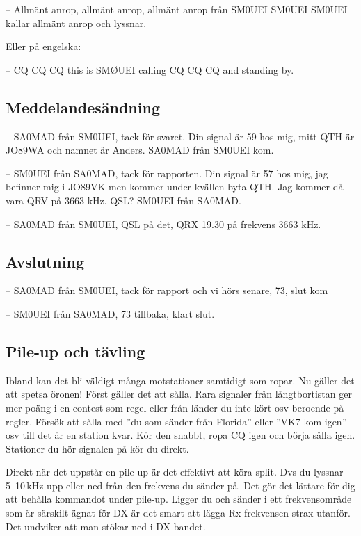 -- Allmänt anrop, allmänt anrop, allmänt anrop från SM0UEI SM0UEI SM0UEI kallar
allmänt anrop och lyssnar.

Eller på engelska:

-- CQ CQ CQ this is SMØUEI calling CQ CQ CQ and standing by.

\subsection{Meddelandesändning}

-- SA0MAD från SM0UEI, tack för svaret. Din signal är 59 hos mig, mitt QTH är
JO89WA och namnet är Anders. SA0MAD från SM0UEI kom.

-- SM0UEI från SA0MAD, tack för rapporten. Din signal är 57 hos mig, jag
befinner mig i JO89VK men kommer under kvällen byta QTH. Jag kommer då vara QRV
på 3663 kHz. QSL? SM0UEI från SA0MAD.

-- SA0MAD från SM0UEI, QSL på det, QRX 19.30 på frekvens 3663 kHz.

\subsection{Avslutning}

-- SA0MAD från SM0UEI, tack för rapport och vi hörs senare, 73, slut kom

-- SM0UEI från SA0MAD, 73 tillbaka, klart slut.

\subsection{Pile-up och tävling}

Ibland kan det bli väldigt många motstationer samtidigt som ropar. Nu
gäller det att spetsa öronen! Först gäller det att sålla. Rara
signaler från långtbortistan ger mer poäng i en contest som regel
eller från länder du inte kört osv beroende på regler. Försök att
sålla med ''du som sänder från Florida'' eller ''VK7 kom igen'' osv
till det är en station kvar. Kör den snabbt, ropa CQ igen och börja
sålla igen. Stationer du hör signalen på kör du direkt.

Direkt när det uppstår en pile-up är det effektivt att köra split. Dvs
du lyssnar 5--10\,kHz upp eller ned från den frekvens du sänder
på. Det gör det lättare för dig att behålla kommandot under
pile-up. Ligger du och sänder i ett frekvensområde som är särskilt
ägnat för DX är det smart att lägga Rx-frekvensen strax utanför. Det
undviker att man stökar ned i DX-bandet.

